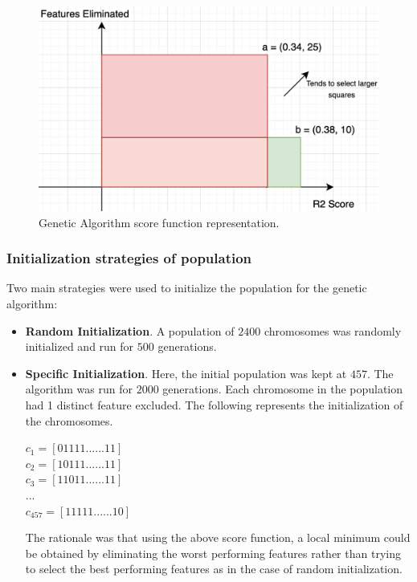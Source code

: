 \documentclass[11pt]{article}
\begin{document}
\begin{figure}[htb]
  \centering
    \includegraphics[scale=0.5]{images/scoreFuntionMultiObject}
    \caption{Genetic Algorithm score function representation.}
    \label{fig:scorefunctionfigure}
\end{figure}

\subsubsection{Initialization strategies of population}
Two main strategies were used to initialize the population for the genetic algorithm:
\begin{itemize}
\item \textbf{Random Initialization}.  A population of $2400$ chromosomes was randomly initialized and run for $500$ generations.
\item \textbf{Specific Initialization}.  Here,  the initial population was kept at $457$.
The algorithm was run for $2000$ generations.
Each chromosome in the population had 1 distinct feature excluded.  The following represents the initialization of the chromosomes.

$
c_1 = [0 1 1 1 1 ......  1 1]
$ \\
$
c_2 = [1 0 1 1 1 ......  1 1]
$ \\
$
c_3 = [1 1 0 1 1 ......  1 1]
$ \\
$
... 
$ \\
$
c_{457} = [1 1 1 1 1 ......  1 0]
$

The rationale was that using the above score function, a local minimum could be obtained by eliminating the worst performing features rather than trying to select the best performing features as in the case of random initialization.
\end{itemize}
\end{document}
